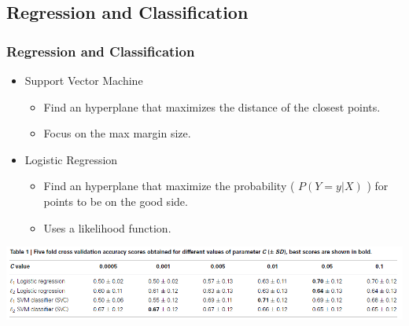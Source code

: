 \documentclass{beamer}
\begin{document}
\subsection{Regression and Classification}
\begin{frame}
\frametitle{Regression and Classification}
\begin{itemize}
\item Support Vector Machine 
	\begin{itemize}
	\item Find an hyperplane that maximizes the distance of the closest points.
    \item Focus on the max margin size.
	\end{itemize}
\item Logistic Regression
	\begin{itemize}
	\item Find an hyperplane that maximize the probability ( $P(Y=y|X)$ ) for points to be on the good side.
    \item Uses a likelihood function.
	\end{itemize}
\end{itemize}

\begin{center}
\includegraphics[scale=.48]{LRvsSVM.png}
\end{center}

\end{frame}
\end{document}
